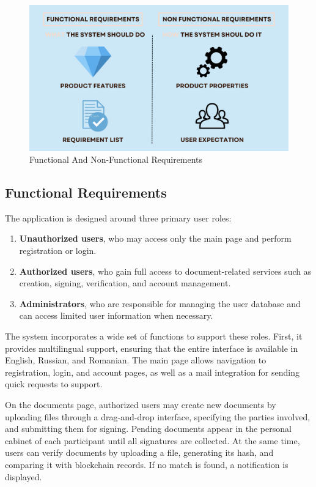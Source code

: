 \begin{figure}[H]
    \centering
    \includegraphics[width=18cm]{"images/func-non-func.png"}
    \caption{Functional And Non-Functional Requirements}
    \label{func-non-func}
\end{figure}

\subsection{Functional Requirements}
The application is designed around three primary user roles:
\begin{enumerate}
    \item \textbf{Unauthorized users}, who may access only the main page and perform registration or login.
    \item \textbf{Authorized users}, who gain full access to document-related services such as creation, signing, verification, and account management.
    \item \textbf{Administrators}, who are responsible for managing the user database and can access limited user information when necessary.
\end{enumerate}

The system incorporates a wide set of functions to support these roles. First, it provides multilingual support, ensuring that the entire interface is available in English, Russian, and Romanian. The main page allows navigation to registration, login, and account pages, as well as a mail integration for sending quick requests to support.

On the documents page, authorized users may create new documents by uploading files through a drag-and-drop interface, specifying the parties involved, and submitting them for signing. Pending documents appear in the personal cabinet of each participant until all signatures are collected. At the same time, users can verify documents by uploading a file, generating its hash, and comparing it with blockchain records. If no match is found, a notification is displayed.

